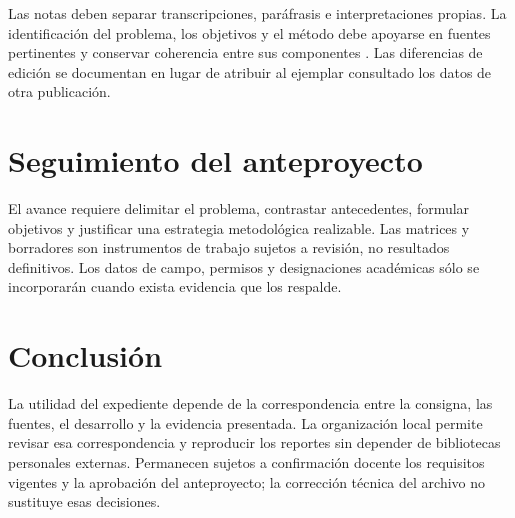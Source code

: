 {Las notas deben separar transcripciones, paráfrasis e interpretaciones propias. La identificación del problema, los objetivos y el método debe apoyarse en fuentes pertinentes y conservar coherencia entre sus componentes \citep{hernandezSampieri2014Metodologia}. Las diferencias de edición se documentan en lugar de atribuir al ejemplar consultado los datos de otra publicación.

\section{Seguimiento del anteproyecto}
El avance requiere delimitar el problema, contrastar antecedentes, formular objetivos y justificar una estrategia metodológica realizable. Las matrices y borradores son instrumentos de trabajo sujetos a revisión, no resultados definitivos. Los datos de campo, permisos y designaciones académicas sólo se incorporarán cuando exista evidencia que los respalde.

\section{Conclusión}
La utilidad del expediente depende de la correspondencia entre la consigna, las fuentes, el desarrollo y la evidencia presentada. La organización local permite revisar esa correspondencia y reproducir los reportes sin depender de bibliotecas personales externas. Permanecen sujetos a confirmación docente los requisitos vigentes y la aprobación del anteproyecto; la corrección técnica del archivo no sustituye esas decisiones.
}
\def\seminarioreferencias{\clearpage}
